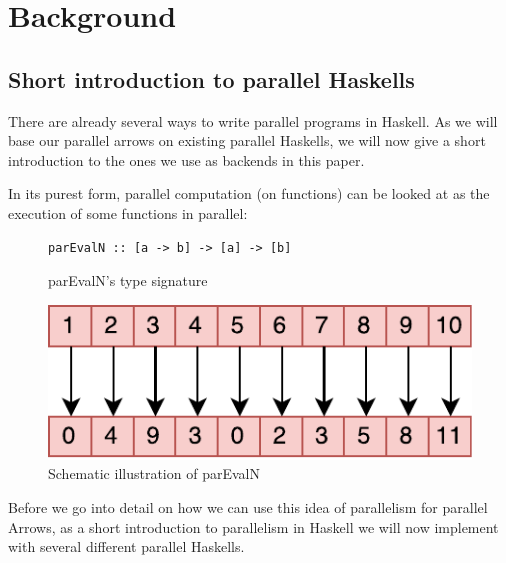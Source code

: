 \section{Background}
\label{sec:background}
\subsection{Short introduction to parallel Haskells}
There are already several ways to write parallel programs in Haskell. As we will base our parallel arrows on existing parallel Haskells, we will now give a short introduction to the ones we use as backends in this paper.

In its purest form, parallel computation (on functions) can be looked at as the execution of some functions  in parallel:

\begin{figure}[h]
\begin{lstlisting}[frame=htrbl]
parEvalN :: [a -> b] -> [a] -> [b]
\end{lstlisting}
\caption{parEvalN's type signature}
\label{fig:parEvalNTypeSig}
\end{figure}
\begin{figure}[h]
	\includegraphics[scale=0.7]{images/parEvalN}
	\caption{Schematic illustration of parEvalN}
	\label{fig:parEvalN}
\end{figure}
Before we go into detail on how we can use this idea of parallelism for parallel Arrows, as a short introduction to parallelism in Haskell we will now implement  with several different parallel Haskells.

